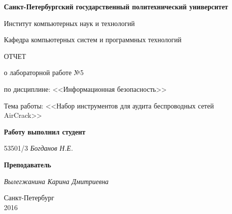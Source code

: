 \begin{titlepage}
\begin{center}

\textbf{Санкт-Петербургский государственный политехнический университет}

\vspace{5mm}
Институт компьютерных наук и технологий

\vspace{5mm}
Кафедра компьютерных систем и программных технологий

\vspace*{\fill}

\huge{ОТЧЕТ}

\Large{о лабораторной работе №5}
\vspace{2mm}

\large{по дисциплине: <<Информационная безопасность>>}

\vspace*{2mm}
\large{Тема работы: <<Набор инструментов для аудита беспроводных сетей AirCrack>>}

\vspace*{\fill}
\end{center}

\begin{large}
\hspace{0.25\linewidth} \textbf{Работу выполнил студент}

\vspace{5mm}
\hspace{0.25\linewidth} 53501/3 \hspace{5mm} \textit{Богданов Н.Е.}

\vspace{3mm}
\hspace{0.25\linewidth} \textbf{Преподаватель}

\vspace{5mm}
\hspace{0.25\linewidth} \underline{\hspace{2cm} } \hspace{3mm} \textit{Вылегжанина Карина Дмитриевна}
\end{large}

\vspace*{3cm}

\begin{center}
\normalsize Санкт-Петербург\\2016
\end{center}
\end{titlepage}